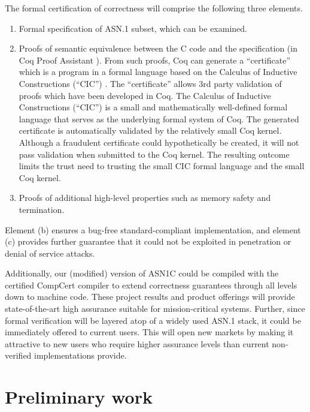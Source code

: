 \documentclass[acmsmall,nonacm]{acmart}
\begin{document}
The formal certification of correctness will comprise the following
three elements.

\begin{enumerate}[label=(\alph*)]

\item Formal specification of ASN.1 subset, which can be examined.

\item Proofs of semantic equivalence between the C code and the
  specification (in Coq Proof Assistant \cite{TODO:14}). From such
  proofs, Coq can generate a ``certificate'' which is a program in a
  formal language based on the Calculus of Inductive Constructions
  (``CIC'') \cite{TODO:35}. The ``certificate'' allows 3rd party
  validation of proofs which have been developed in Coq. The Calculus
  of Inductive Constructions (``CIC'') is a small and mathematically
  well-defined formal language that serves as the underlying formal
  system of Coq. The generated certificate is automatically validated
  by the relatively small Coq kernel. Although a fraudulent
  certificate could hypothetically be created, it will not pass
  validation when submitted to the Coq kernel. The resulting outcome
  limits the trust need to trusting the small CIC formal language and
  the small Coq kernel.

\item Proofs of additional high-level properties such as memory safety
  and termination.

\end{enumerate}
  

Element (b) ensures a bug-free standard-compliant implementation, and
element (c) provides further guarantee that it could not be exploited
in penetration or denial of service attacks.

Additionally, our (modified) version of ASN1C could be compiled with
the certified CompCert compiler \cite{TODO:3} to extend correctness
guarantees through all levels down to machine code. These project
results and product offerings will provide state-of-the-art high
assurance suitable for mission-critical systems. Further, since formal
verification will be layered atop of a widely used ASN.1 stack, it
could be immediately offered to current users. This will open new
markets by making it attractive to new users who require higher
assurance levels than current non-verified implementations provide.

\section{Preliminary work}
\end{document}
